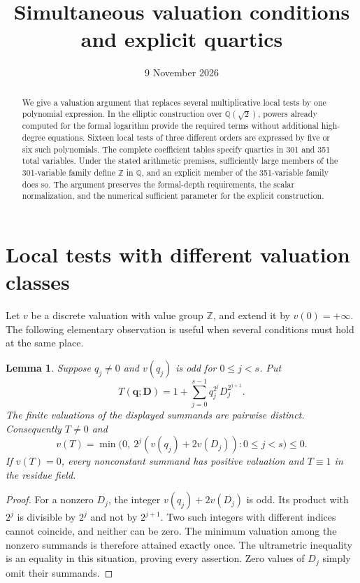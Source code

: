 \documentclass[11pt,a4paper]{article}
\title{Simultaneous valuation conditions and explicit quartics}
\author{}\date{9 November 2026}
\newtheorem{lemma}[theorem]{Lemma}
\theoremstyle{remark}\newtheorem{remark}[theorem]{Remark}
\newcommand{\Q}{\mathbb Q}\newcommand{\Z}{\mathbb Z}
\begin{document}
\maketitle
\begin{abstract}
We give a valuation argument that replaces several multiplicative local
tests by one polynomial expression. In the elliptic construction over
$\Q(\sqrt2)$, powers already computed for the formal logarithm provide
the required terms without additional high-degree equations. Sixteen
local tests of three different orders are expressed by five or six
such polynomials. The complete coefficient tables specify quartics
in 301 and 351 total variables.
Under the stated arithmetic premises, sufficiently large members of the
301-variable family define $\Z$ in $\Q$, and an explicit member of the
351-variable family does so. The argument preserves the formal-depth
requirements, the scalar normalization, and the numerical sufficient
parameter for the explicit construction.
\end{abstract}

\section{Local tests with different valuation classes}
Let $v$ be a discrete valuation with value group $\Z$, and extend it
by $v(0)=+\infty$. The following elementary observation is useful when
several conditions must hold at the same place.

\begin{lemma}\label{lem:distinct}
Suppose $q_j\ne0$ and $v(q_j)$ is odd for $0\le j<s$. Put
\[
 T(\boldsymbol q;\boldsymbol D)
 =1+\sum_{j=0}^{s-1}q_j^{2^j}D_j^{2^{j+1}}.
\]
The finite valuations of the displayed summands are pairwise distinct.
Consequently $T\ne0$ and
\[
 v(T)=\min\bigl(0,\ 2^j(v(q_j)+2v(D_j)):0\le j<s\bigr)\le0.
\]
If $v(T)=0$, every nonconstant summand has positive valuation and
$T\equiv1$ in the residue field.
\end{lemma}
\begin{proof}
For a nonzero $D_j$, the integer $v(q_j)+2v(D_j)$ is odd.
Its product with $2^j$ is divisible by $2^j$ and not by $2^{j+1}$.
Two such integers with different indices cannot coincide, and neither
can be zero. The minimum valuation among the nonzero summands is
therefore attained exactly once. The ultrametric inequality is an
equality in this situation, proving every assertion. Zero values of
$D_j$ simply omit their summands.
\end{proof}
\end{document}
